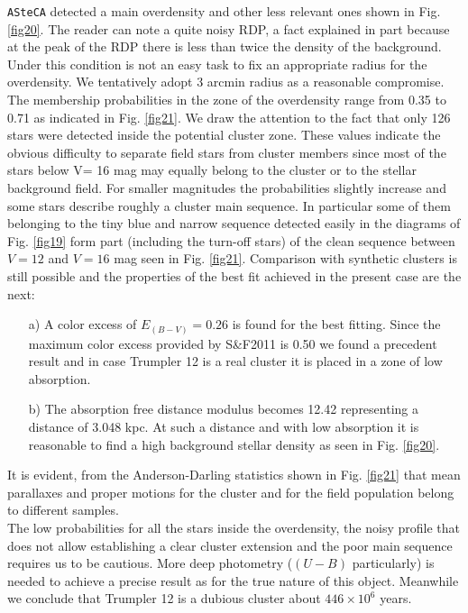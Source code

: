 \documentclass{aa}
\begin{document}
\texttt{ASteCA} detected a main overdensity and other less relevant ones shown
in Fig. \ref{fig20}. The reader can note a quite noisy RDP, a fact explained in
part because at the peak of the RDP there is less than twice the density of the
background. Under this condition is not an easy task to fix an appropriate
radius for the overdensity. We tentatively adopt 3 arcmin radius as a reasonable
compromise. The membership probabilities in the zone of the overdensity range
from 0.35 to 0.71 as indicated in Fig. \ref{fig21}. We draw the attention to the
fact that only 126 stars were detected inside the potential cluster zone. These
values indicate the obvious difficulty to separate field stars from cluster
members since most of the stars below V= 16 mag may equally belong to the
cluster or to the stellar background field. For smaller magnitudes the
probabilities slightly increase and some stars describe roughly a cluster main
sequence. In particular some of them belonging to the tiny blue and narrow
sequence detected easily in the diagrams of Fig. \ref{fig19} form part
(including the turn-off stars) of the clean sequence between $V = 12$ and $V =
16$ mag seen in Fig. \ref{fig21}. Comparison with synthetic clusters is still
possible and the properties of the best fit achieved in the present case are the
next:

\begin{itemize}
\item [a)] A color excess of $E_{(B-V)} = 0.26$ is found for the best fitting.
    Since the maximum color excess provided by S\&F2011 is 0.50 we found a
    precedent result and in case Trumpler 12 is a real cluster it is placed in a
    zone of low absorption.
\item [b)] The absorption free distance modulus becomes 12.42 representing a
    distance of 3.048 kpc. At such a distance and with low absorption it is
    reasonable to find a high background stellar density as seen in Fig. 
    \ref{fig20}.
\end{itemize}

It is evident, from the Anderson-Darling statistics shown in Fig. \ref{fig21}
that mean parallaxes and proper motions for the cluster and for the field
population belong to different samples.\\

The low probabilities for all the stars inside the overdensity, the noisy
profile that does not allow establishing a clear cluster extension and the poor
main sequence requires us to be cautious. More deep photometry ($(U-B)$
particularly) is needed to achieve a precise result as for the true nature of
this object. Meanwhile we conclude that Trumpler 12 is a dubious cluster about
$446\times10^6$ years.
\end{document}
